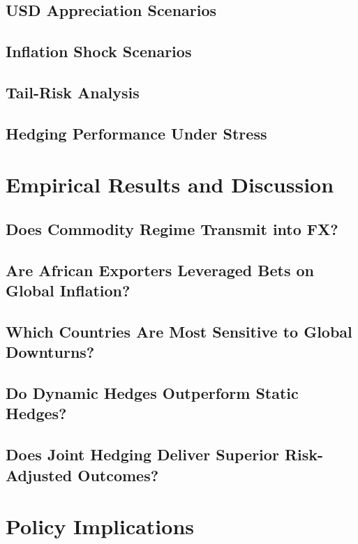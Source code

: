 \documentclass{article}
\begin{document}
\subsection{USD Appreciation Scenarios}

\subsection{Inflation Shock Scenarios}

\subsection{Tail-Risk Analysis}

\subsection{Hedging Performance Under Stress}

\section{Empirical Results and Discussion}

\subsection{Does Commodity Regime Transmit into FX?}

\subsection{Are African Exporters Leveraged Bets on Global Inflation?}

\subsection{Which Countries Are Most Sensitive to Global Downturns?}

\subsection{Do Dynamic Hedges Outperform Static Hedges?}

\subsection{Does Joint Hedging Deliver Superior Risk-Adjusted Outcomes?}

\section{Policy Implications}
\end{document}
